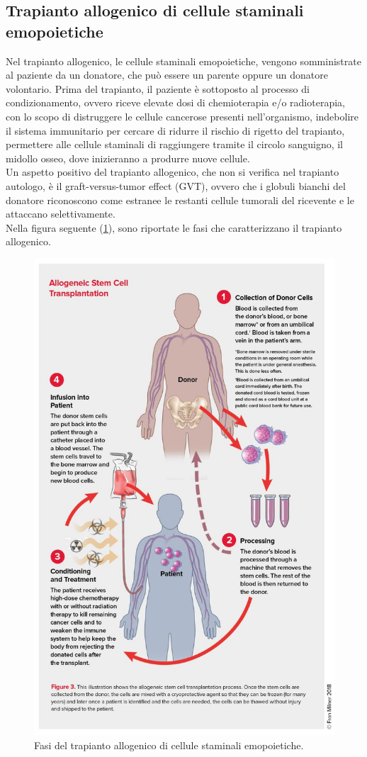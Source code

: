 \subsection{Trapianto allogenico di cellule staminali emopoietiche}

Nel trapianto allogenico, le cellule staminali emopoietiche, vengono somministrate al paziente da un donatore, 
che può essere un parente oppure un donatore volontario. 
Prima del trapianto, il paziente è sottoposto al processo di condizionamento, ovvero riceve elevate dosi di 
chemioterapia e/o radioterapia, con lo scopo di distruggere le cellule cancerose presenti nell’organismo, 
indebolire il sistema immunitario per cercare di ridurre il rischio di rigetto del trapianto, permettere alle 
cellule staminali di raggiungere tramite il circolo sanguigno, il midollo osseo, dove inizieranno a produrre nuove 
cellule.\\
Un aspetto positivo del trapianto allogenico, che non si verifica nel trapianto autologo, è il graft-versus-tumor 
effect (GVT), ovvero che i globuli bianchi del donatore riconoscono come estranee le restanti cellule tumorali 
del ricevente e le attaccano selettivamente\cite{LLSBLOOD}.\\ Nella figura seguente (\ref{fig:FIGURE_3.16}), 
sono riportate le fasi che caratterizzano il trapianto allogenico.

\begin{figure}[H]
    \begin{center}
    \includegraphics[width=0.7\columnwidth]{img/ALLOGENICO.jpg}
    \end{center}
    \caption{Fasi del trapianto allogenico di cellule staminali emopoietiche.
    \cite{LLSBLOOD}}
    \label{fig:FIGURE_3.16}
\end{figure}

